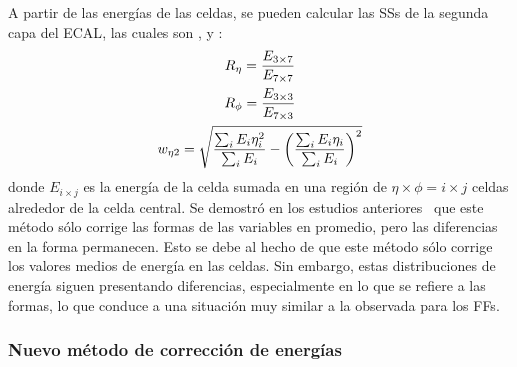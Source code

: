 A partir de las energ\'ias de las celdas, se pueden calcular las \acp{SS} de la segunda capa del \ac{ECAL}, las cuales son \reta, \rphi y \weta:
\begin{gather*}
    R_{\eta} = \frac{E_{3\times 7}}{E_{7\times 7}}\\
    R_{\phi} = \frac{E_{3\times 3}}{E_{7\times 3}}\\
    w_{\eta 2} = \sqrt{\frac{\sum_i E_i \eta^2_i}{\sum_i E_i} - \left( \frac{\sum_i E_i \eta_i}{\sum_i E_i} \right)^2}
\end{gather*}
donde \(E_{i\times j}\) es la energía de la celda sumada en una región de \(\eta\times\phi=i\times j\) celdas alrededor de la celda central. Se demostró en los estudios anteriores~\cite{thesis_belfkir} que este método sólo corrige las formas de las variables en promedio, pero las diferencias en la forma permanecen. Esto se debe al hecho de que este método sólo corrige los valores medios de energ\'ia en las celdas. Sin embargo, estas distribuciones de energía siguen presentando diferencias, especialmente en lo que se refiere a las formas, lo que conduce a una situación muy similar a la observada para los \acp{FF}.
























\subsubsection{Nuevo m\'etodo de correcci\'on de energ\'ias}

